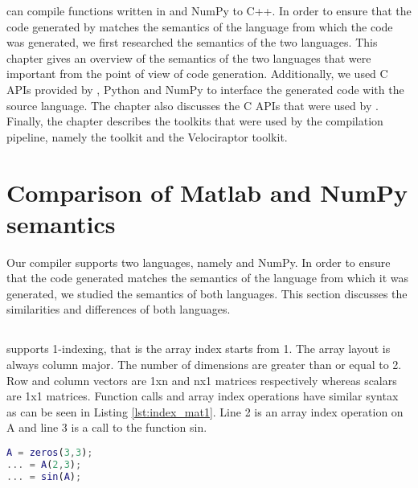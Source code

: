 \velocty can compile functions written in \matlab and NumPy to C++. In order to ensure that the code generated by \velocty matches the semantics of the language from which the code was generated, we first researched the semantics of the two languages. This chapter gives an overview of the semantics of the two languages that were important from the point of view of code generation.  Additionally, we used C APIs provided by \matlab, Python and NumPy to interface the generated code with the source language. The chapter also discusses the C APIs that were used by \velocty. Finally, the chapter describes the toolkits that were used by the compilation pipeline, namely the \mclab toolkit and the Velociraptor toolkit. 
\section{Comparison of Matlab and NumPy semantics}
Our compiler supports two languages, namely \matlab and NumPy. In order to ensure that the code generated matches the semantics of the language from which it was generated, we studied the semantics of both languages. This section discusses the similarities and differences of both languages. 
\subsection{\matlab}
\matlab supports 1-indexing, that is the array index starts from 1. 
The array layout is always column major. The number of dimensions are greater than or equal to 2. Row and column vectors are 1xn and nx1 matrices respectively whereas  scalars are 1x1 matrices. Function calls and array index operations have similar syntax as can be seen in Listing \ref{lst:index_mat1}. Line 2 is an array index operation on \textsf{A} and line 3 is a call to the function \textsf{sin}. 
\begin{lstlisting}[language=matlab, label={lst:index_mat1}, caption={An example of an array index operation and a function call. The array index operation and the function call have similar syntax. }]
A = zeros(3,3);
... = A(2,3);
...	= sin(A);
\end{lstlisting}

